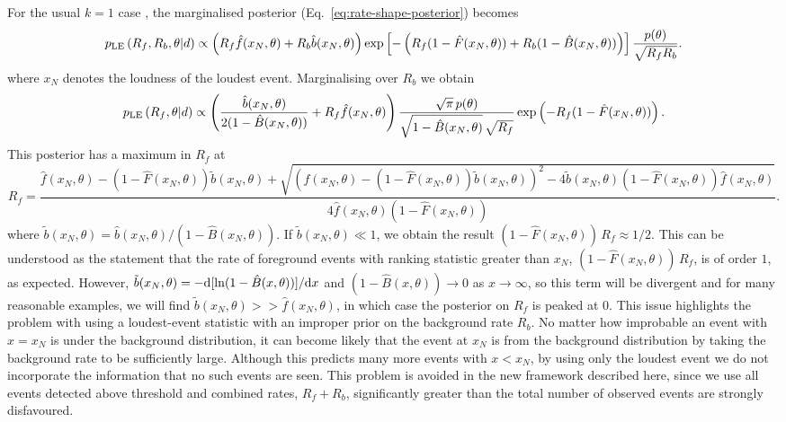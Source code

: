 \documentclass[aps,prd]{revtex4-1}
\begin{document}
For the usual $k=1$ case \citep{Biswas2009}, the marginalised
posterior (Eq.~\eqref{eq:rate-shape-posterior}) becomes
\begin{equation}
p_{\rm LE}\left( R_f, R_b, \theta | d \right) \propto \left(R_f
\hat{f}(x_N,\theta) + R_b \hat{b}(x_N,\theta)\right)\exp\left[-\left(
  R_f (1-\hat{F}(x_N,\theta)) + R_b (1-\hat{B}(x_N,\theta)) \right)
  \right] \frac{p(\theta)}{\sqrt{R_f R_b}}.
\end{equation}
where $x_N$ denotes the loudness of the loudest event. Marginalising
over $R_b$ we obtain
\begin{equation}
p_{\rm LE}\left( R_f, \theta | d \right) \propto \left(
\frac{\hat{b}(x_N,\theta)}{2(1-\hat{B}(x_N,\theta))} + R_f
\hat{f}(x_N,\theta)\right)\frac{\sqrt{\pi}\,
  p(\theta)}{\sqrt{1-\hat{B}(x_N,\theta)}\,\sqrt{R_f}}
\exp\left(-R_f(1-\hat{F}(x_N,\theta))\right) .
\end{equation}
This posterior has a maximum in $R_f$ at
\begin{equation}
R_f =
\frac{\hat{f}(x_N,\theta)-(1-\hat{F}(x_N,\theta))\tilde{b}(x_N,\theta)
  +
  \sqrt{\left(\hat{f}(x_N,\theta)-(1-\hat{F}(x_N,\theta))\tilde{b}(x_N,\theta)\right)^2
    -
    4\tilde{b}(x_N,\theta)(1-\hat{F}(x_N,\theta))\hat{f}(x_N,\theta)}}{4
  \hat{f}(x_N,\theta)(1-\hat{F}(x_N,\theta))}.
\end{equation}
where $\tilde{b}(x_N,\theta)
=\hat{b}(x_N,\theta)/(1-\hat{B}(x_N,\theta))$. If
$\tilde{b}(x_N,\theta) \ll 1$, we obtain the result $(1-
\hat{F}(x_N,\theta))\,R_f \approx 1/2$. This can be understood as the
statement that the rate of foreground events with ranking statistic
greater than $x_N$, $(1- \hat{F}(x_N,\theta))\,R_f$, is of order $1$,
as expected. However, $\tilde{b}(x_N,\theta) = -{\rm d}
[\ln(1-\hat{B}(x,\theta))]/{\rm d}x$ and $(1-\hat{B}(x,\theta))
\rightarrow 0$ as $x \rightarrow \infty$, so this term will be
divergent and for many reasonable examples, we will find
$\tilde{b}(x_N,\theta) >> \hat{f}(x_N,\theta)$, in which case the
posterior on $R_f$ is peaked at $0$. This issue highlights the problem
with using a loudest-event statistic with an improper prior on the
background rate $R_b$. No matter how improbable an event with $x=x_N$
is under the background distribution, it can become likely that the
event at $x_N$ is from the background distribution by taking the
background rate to be sufficiently large. Although this predicts many
more events with $x < x_N$, by using only the loudest event we do not
incorporate the information that no such events are seen. This problem
is avoided in the new framework described here, since we use all
events detected above threshold and combined rates, $R_f+R_b$,
significantly greater than the total number of observed events are
strongly disfavoured.
\end{document}
